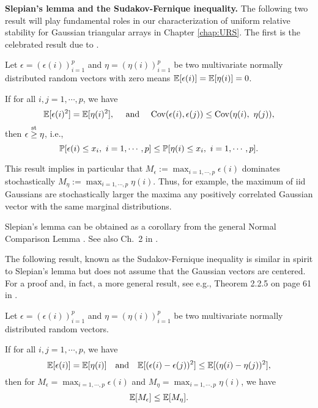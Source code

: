 {\bf Slepian's lemma and the Sudakov-Fernique inequality.} 
The following two result will play fundamental roles in our characterization of uniform relative stability for Gaussian triangular arrays in 
Chapter \ref{chap:URS}. 
The first is the celebrated result due to \citet{slepian1962one}.

\begin{theorem}\label{thm:Slepian-lemma} Let $\epsilon = (\epsilon(i))_{i=1}^p$ and $\eta = (\eta(i))_{i=1}^p$ be 
two multivariate normally distributed random vectors with zero means ${\mathbb E} [\epsilon(i)] = {\mathbb E}[\eta(i)] = 0$. 

 If for all $i,j=1,\cdots,p$, we have
$$
{\mathbb E} [\epsilon(i)^2] = {\mathbb E}[\eta(i)^2],\ \ \ \mbox{ and }\ \ \ {\rm Cov}(\epsilon(i),\epsilon(j)) \le {\rm Cov}(\eta(i),\ \eta(j)),
$$
 then $\epsilon \stackrel{{\rm st}}{\ge} \eta$, i.e.,
$$
\P [ \epsilon(i) \le x_i,\ i=1,\cdots,p] \le \P [ \eta(i) \le x_i,\ i=1,\cdots,p].
$$
\end{theorem}


This result implies in particular that $M_\epsilon:= \max_{i=1,\cdots,p}\epsilon(i)$ dominates stochastically $M_\eta:= \max_{i=1,\cdots,p} \eta(i)$.
Thus, for example, the maximum of iid Gaussians are stochastically larger the maxima any positively correlated Gaussian vector 
with the same marginal distributions. 

Slepian's lemma can be obtained as a corollary from the general Normal Comparison Lemma 
\citep[see, e.g., Theorem 4.2.1 on page 81 in][]{leadbetter2012extremes}.  See also Ch.\ 2 in \cite{adler2009random}.

The following result, known as the Sudakov-Fernique inequality is similar in spirit to Slepian's lemma but does not assume that the Gaussian 
vectors are centered. For a proof and, in fact, a more general result, see e.g., Theorem 2.2.5 on page 61 in \cite{adler2009random}.

\begin{theorem}  \label{th:Sudakov-Fernique} 
Let $\epsilon = (\epsilon(i))_{i=1}^p$ and $\eta = (\eta(i))_{i=1}^p$ be 
two multivariate normally distributed random vectors.

If for all $i,j=1,\cdots,p$, we have 
$$
\E [ \epsilon(i) ] = \E [\eta(i)] \ \ \mbox{ and }\ \ \E [ (\epsilon(i)-\epsilon(j))^2] \le \E [ (\eta(i)-\eta(j))^2],
$$
then for $M_\epsilon = \max_{i=1,\cdots,p}\epsilon(i)$ and $M_\eta = \max_{i=1,\cdots,p} \eta(i)$, we have 
$$
 {\mathbb E} [ M_\epsilon ] \le {\mathbb E} [M_\eta].
$$
\end{theorem}


